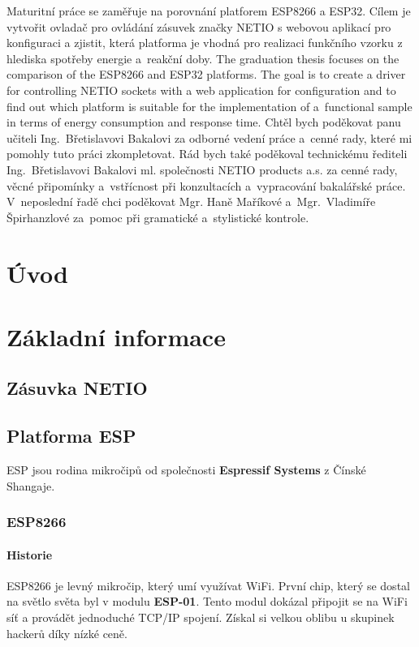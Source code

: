\documentclass[a4paper, 12pt]{report}
\begin{document}
	\titulniStrana
	\anotace
		Maturitní práce se zaměřuje na porovnání platforem ESP8266 a ESP32. Cílem je vytvořit ovladač pro ovládání zásuvek značky NETIO s webovou aplikací pro konfiguraci a zjistit, která platforma je vhodná pro realizaci funkčního vzorku z hlediska spotřeby energie a~reakční doby.
	\annotation
		The graduation thesis focuses on the comparison of the ESP8266 and ESP32 platforms. The goal is to create a driver for controlling NETIO sockets with a web application for configuration and to find out which platform is suitable for the implementation of a~functional sample in terms of energy consumption and response time.
	\podekovani
		Chtěl bych poděkovat panu učiteli Ing.~Břetislavovi Bakalovi za odborné vedení práce a~cenné rady, které mi pomohly tuto práci zkompletovat. Rád bych také poděkoval  technickému řediteli Ing.~Břetislavovi Bakalovi ml. společnosti NETIO products a.s. za cenné rady, věcné připomínky a~vstřícnost při konzultacích a~vypracování bakalářské práce. V~neposlední řadě chci poděkovat Mgr. Haně Maříkové a~Mgr.~Vladimíře Špirhanzlové za~pomoc při gramatické a~stylistické kontrole.
	\tableofcontents

	\chapter{Úvod}
	\chapter{Základní informace}
		\section{Zásuvka NETIO}
		\section{Platforma ESP}
			ESP jsou rodina mikročipů od společnosti \textbf{Espressif Systems} z Čínské Shangaje.
			\subsection{ESP8266}
				\subsubsection{Historie}
					ESP8266 je levný mikročip, který umí využívat WiFi. První chip, který se dostal na světlo světa byl v modulu \textbf{ESP-01}. Tento modul dokázal připojit se na WiFi síť a provádět jednoduché TCP/IP spojení. Získal si velkou oblibu u skupinek hackerů díky nízké ceně.
\end{document}
